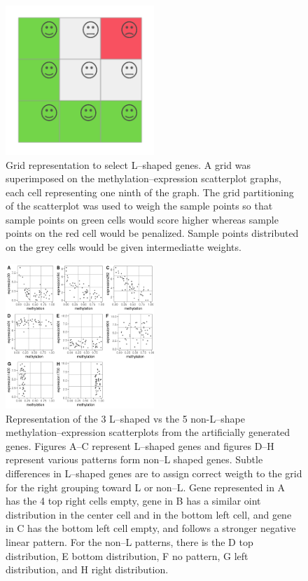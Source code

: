 \documentclass[10pt,letterpaper]{article}
\begin{document}
\begin{figure}
\hypertarget{id}{%
\centering
\includegraphics[width=0.5\textwidth,height=0.3\textheight]{figures/Figure2.png}
\caption{Grid representation to select L--shaped genes. A grid was
superimposed on the methylation--expression scatterplot graphs, each
cell representing one ninth of the graph. The grid partitioning of the
scatterplot was used to weigh the sample points so that sample points on
green cells would score higher whereas sample points on the red cell
would be penalized. Sample points distributed on the grey cells would be
given intermediatte weights.}\label{id}
}
\end{figure}

\begin{figure}
\hypertarget{id}{%
\centering
\includegraphics[width=0.5\textwidth,height=0.3\textheight]{figures/Figure3.png}
\caption{Representation of the 3 L--shaped vs the 5 non-L--shape
methylation--expression scatterplots from the artificially generated
genes. Figures A--C represent L--shaped genes and figures D--H represent
various patterns form non--L shaped genes. Subtle differences in
L--shaped genes are to assign correct weigth to the grid for the right
grouping toward L or non--L. Gene represented in A has the 4 top right
cells empty, gene in B has a similar oint distribution in the center
cell and in the bottom left cell, and gene in C has the bottom left cell
empty, and follows a stronger negative linear pattern. For the non--L
patterns, there is the D top distribution, E bottom distribution, F no
pattern, G left distribution, and H right distribution.}\label{id}
}
\end{figure}
\end{document}
